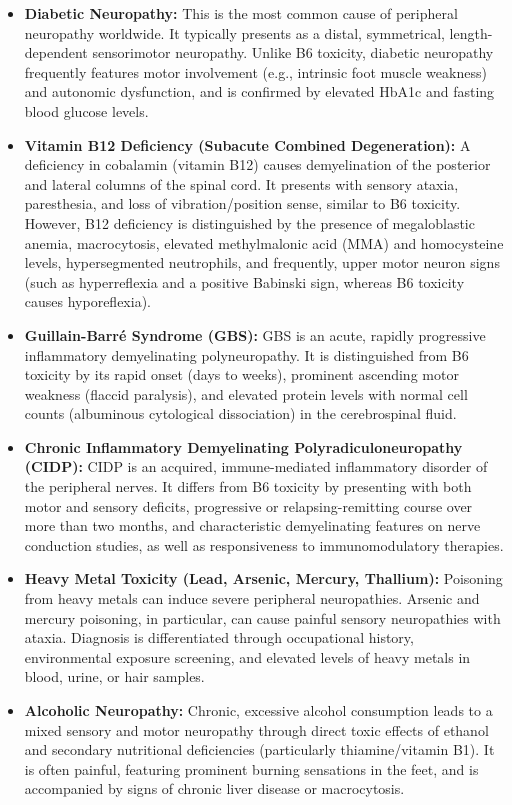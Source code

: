 \begin{itemize}
    \item \textbf{Diabetic Neuropathy:} This is the most common cause of peripheral neuropathy worldwide. It typically presents as a distal, symmetrical, length-dependent sensorimotor neuropathy. Unlike B6 toxicity, diabetic neuropathy frequently features motor involvement (e.g., intrinsic foot muscle weakness) and autonomic dysfunction, and is confirmed by elevated HbA1c and fasting blood glucose levels.
    \item \textbf{Vitamin B12 Deficiency (Subacute Combined Degeneration):} A deficiency in cobalamin (vitamin B12) causes demyelination of the posterior and lateral columns of the spinal cord. It presents with sensory ataxia, paresthesia, and loss of vibration/position sense, similar to B6 toxicity. However, B12 deficiency is distinguished by the presence of megaloblastic anemia, macrocytosis, elevated methylmalonic acid (MMA) and homocysteine levels, hypersegmented neutrophils, and frequently, upper motor neuron signs (such as hyperreflexia and a positive Babinski sign, whereas B6 toxicity causes hyporeflexia).
    \item \textbf{Guillain-Barr\'{e} Syndrome (GBS):} GBS is an acute, rapidly progressive inflammatory demyelinating polyneuropathy. It is distinguished from B6 toxicity by its rapid onset (days to weeks), prominent ascending motor weakness (flaccid paralysis), and elevated protein levels with normal cell counts (albuminous cytological dissociation) in the cerebrospinal fluid.
    \item \textbf{Chronic Inflammatory Demyelinating Polyradiculoneuropathy (CIDP):} CIDP is an acquired, immune-mediated inflammatory disorder of the peripheral nerves. It differs from B6 toxicity by presenting with both motor and sensory deficits, progressive or relapsing-remitting course over more than two months, and characteristic demyelinating features on nerve conduction studies, as well as responsiveness to immunomodulatory therapies.
    \item \textbf{Heavy Metal Toxicity (Lead, Arsenic, Mercury, Thallium):} Poisoning from heavy metals can induce severe peripheral neuropathies. Arsenic and mercury poisoning, in particular, can cause painful sensory neuropathies with ataxia. Diagnosis is differentiated through occupational history, environmental exposure screening, and elevated levels of heavy metals in blood, urine, or hair samples.
    \item \textbf{Alcoholic Neuropathy:} Chronic, excessive alcohol consumption leads to a mixed sensory and motor neuropathy through direct toxic effects of ethanol and secondary nutritional deficiencies (particularly thiamine/vitamin B1). It is often painful, featuring prominent burning sensations in the feet, and is accompanied by signs of chronic liver disease or macrocytosis.

\end{itemize}

